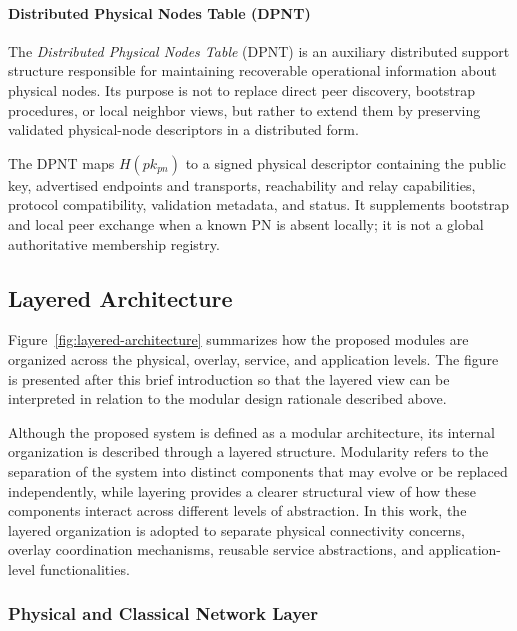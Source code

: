 \documentclass[12pt]{article}
\begin{document}
\paragraph{Distributed Physical Nodes Table (DPNT)}

The \textit{Distributed Physical Nodes Table} (DPNT) is an auxiliary distributed support structure responsible for maintaining recoverable operational information about physical nodes. Its purpose is not to replace direct peer discovery, bootstrap procedures, or local neighbor views, but rather to extend them by preserving validated physical-node descriptors in a distributed form.

The DPNT maps $H(pk_{pn})$ to a signed physical descriptor containing the public key, advertised endpoints and transports, reachability and relay capabilities, protocol compatibility, validation metadata, and status. It supplements bootstrap and local peer exchange when a known PN is absent locally; it is not a global authoritative membership registry.



\subsection{Layered Architecture}

Figure~\ref{fig:layered-architecture} summarizes how the proposed modules are organized across the physical, overlay, service, and application levels. The figure is presented after this brief introduction so that the layered view can be interpreted in relation to the modular design rationale described above.

\thesislayerstikz

Although the proposed system is defined as a modular architecture, its internal organization is described through a layered structure. Modularity refers to the separation of the system into distinct components that may evolve or be replaced independently, while layering provides a clearer structural view of how these components interact across different levels of abstraction. In this work, the layered organization is adopted to separate physical connectivity concerns, overlay coordination mechanisms, reusable service abstractions, and application-level functionalities.

\subsubsection{Physical and Classical Network Layer}
\end{document}
